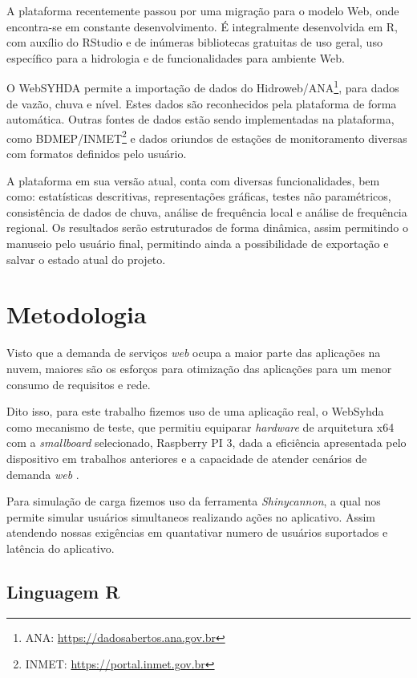 \documentclass[12pt,english,brazil]{article}
\begin{document}
A plataforma recentemente passou por uma migração para o modelo Web, onde encontra-se em constante desenvolvimento. É integralmente desenvolvida em R, com auxílio do RStudio e de inúmeras bibliotecas gratuitas de uso geral, uso específico para a hidrologia e de funcionalidades para ambiente Web. %

O WebSYHDA permite a importação de dados do Hidroweb/ANA\footnote{ANA: \url{https://dadosabertos.ana.gov.br}}, para dados de vazão, chuva e nível. Estes dados são reconhecidos pela plataforma de forma automática. Outras fontes de dados estão sendo implementadas na plataforma, como BDMEP/INMET\footnote{INMET: \url{https://portal.inmet.gov.br}} e dados oriundos de estações de monitoramento diversas com formatos definidos pelo usuário.

A plataforma em sua versão atual, conta com diversas funcionalidades, bem como: estatísticas descritivas, representações gráficas, testes não paramétricos, consistência de dados de chuva, análise de frequência local e análise de frequência regional. Os resultados serão estruturados de forma dinâmica, assim permitindo o manuseio pelo usuário final, permitindo ainda a possibilidade de exportação e salvar o estado atual do projeto. 

\section{Metodologia} \label{sec:metodologia}

Visto que a demanda de serviços \textit{web} ocupa a maior parte das aplicações na nuvem, maiores são os esforços para otimização das aplicações para um menor consumo de requisitos e rede. 

Dito isso, para este trabalho fizemos uso de uma aplicação real, o WebSyhda como mecanismo de teste, que permitiu equiparar \emph{hardware} de arquitetura x64 com a \emph{smallboard} selecionado, Raspberry PI 3, dada a eficiência apresentada pelo dispositivo em trabalhos anteriores e a capacidade de atender cenários de demanda \emph{web} \cite{silva2019estudo}.

Para simulação de carga fizemos uso da ferramenta \emph{Shinycannon}, a qual nos permite simular usuários simultaneos realizando ações no aplicativo. Assim atendendo nossas exigências em quantativar numero de usuários suportados e latência do aplicativo.



\subsection{Linguagem R} \label{sec:R}
\end{document}
